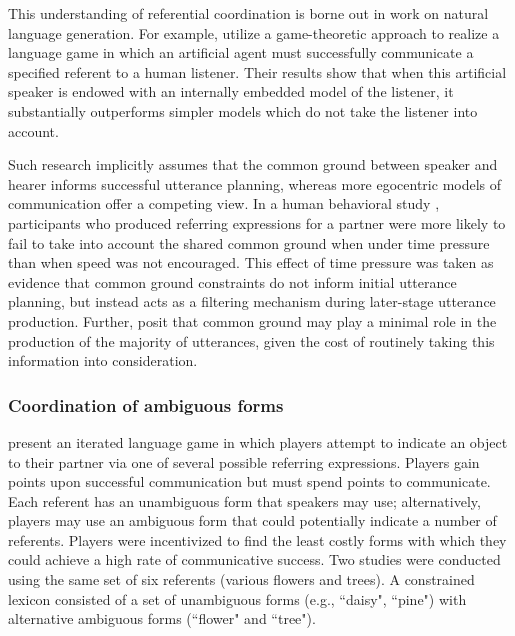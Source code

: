\documentclass[a4paper,11pt]{article}
\begin{document}
This understanding of referential coordination is borne out in work on natural language generation. For example,  utilize a game-theoretic approach to realize a language game in which an artificial agent must successfully communicate a specified referent to a human listener. Their results show that when this artificial speaker is endowed with an internally embedded model of the listener, it substantially outperforms simpler models which do not take the listener into account.

Such research implicitly assumes that the common ground between speaker and hearer informs successful utterance planning, whereas more egocentric models of communication offer a competing view. In a human behavioral study \cite{horton1996}, participants who produced referring expressions for a partner were more likely to fail to take into account the shared common ground when under time pressure than when speed was not encouraged. This effect of time pressure was taken as evidence that common ground constraints do not inform initial utterance planning, but instead acts as a filtering mechanism during later-stage utterance production. Further,  posit that common ground may play a minimal role in the production of the majority of utterances, given the cost of routinely taking this information into consideration.

\subsubsection{Coordination of ambiguous forms}
 present an iterated language game in which players attempt to indicate an object to their partner via one of several possible referring expressions. Players gain points upon successful communication but must spend points to communicate. Each referent has an unambiguous form that speakers may use; alternatively, players may use an ambiguous form that could potentially indicate a number of referents. Players were incentivized to find the least costly forms with which they could achieve a high rate of communicative success. Two studies were conducted using the same set of six referents (various flowers and trees). A constrained lexicon consisted of a set of unambiguous forms (e.g., ``daisy", ``pine") with alternative ambiguous forms (``flower" and ``tree").
\end{document}
